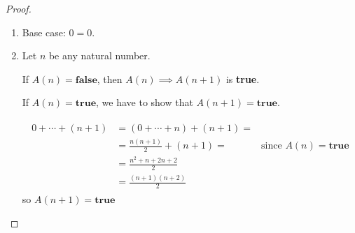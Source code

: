 \documentclass[11pt]{beamer}
\theoremstyle{definition}
\begin{document}
\begin{frame}
  \begin{proof}
  \begin{enumerate}
  \item Base case: $0=0$.
    \pause
  \item Let $n$ be any natural number.
    \pause
      
      If $A(n)=\textbf{false}$, then $A(n)\implies A(n+1)$ is \textbf{true}.
      \pause

      If $A(n)=\textbf{true}$, we have to show that $A(n+1)=\textbf{true}$.
      \pause
      
      \begin{align*}
        \begin{array}{rlr}
          0+\cdots +(n+1)& = (0+\cdots+ n)+(n+1)=\\
          & = \frac{n(n+1)}{2}+(n+1)= & \text{since }A(n)=\textbf{true}\\
          & = \frac{n^2+n+2n+2}{2}\\
          & = \frac{(n+1)(n+2)}{2}
        \end{array}
      \end{align*}
      so $A(n+1)=\textbf{true}$

  \end{enumerate}
  \end{proof}
\end{frame}
\end{document}
